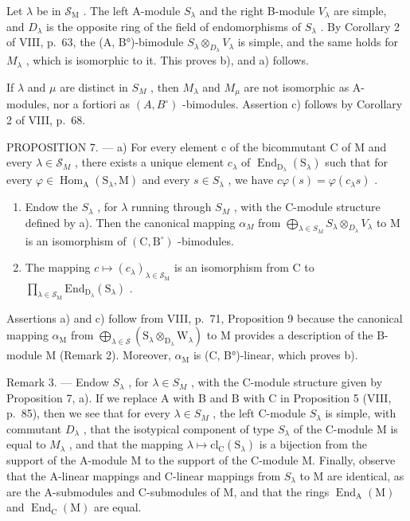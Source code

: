 Let \(\lambda\) be in \(\mathcal{S}_{\mathrm{M}}\) . The left A-module \(S_{\lambda}\) and the right B-module \(V_{\lambda}\) are simple, and \(D_{\lambda}\) is the opposite ring of the field of endomorphisms of \(S_{\lambda}\) . By Corollary 2 of VIII, p.~63, the (A, B°)-bimodule \(S_{\lambda} \otimes_{D_{\lambda}} V_{\lambda}\) is simple, and the same holds for \(M_{\lambda}\) , which is isomorphic to it. This proves b), and a) follows.

If \(\lambda\) and \(\mu\) are distinct in \(S_{M}\) , then \(M_{\lambda}\) and \(M_{\mu}\) are not isomorphic as A-modules, nor a fortiori as \((A,B^{\circ})\) -bimodules. Assertion c) follows by Corollary 2 of VIII, p.~68.

PROPOSITION 7. --- a) For every element c of the bicommutant C of M and every \(\lambda\in\mathcal{S}_{M}\) , there exists a unique element \(c_{\lambda}\) of \(\operatorname{End}_{\mathrm{D}_{\lambda}}(\mathrm{S}_{\lambda})\) such that for every \(\varphi\in\operatorname{Hom}_{\mathrm{A}}(\mathrm{S}_{\lambda},\mathrm{M})\) and every \(s\in S_{\lambda}\) , we have \(c\varphi(s)=\varphi(c_{\lambda}s)\) .

\begin{enumerate}
\def\labelenumi{\alph{enumi})}
\setcounter{enumi}{1}
\item
  Endow the \(S_{\lambda}\) , for \(\lambda\) running through \(S_{M}\) , with the C-module structure defined by a). Then the canonical mapping \(\alpha_{M}\) from \(\bigoplus_{\lambda\in S_{M}}S_{\lambda}\otimes_{D_{\lambda}}V_{\lambda}\) to M is an isomorphism of \((\mathrm{C},\mathrm{B}^{\circ})\) -bimodules.
\item
  The mapping \(c \mapsto (c_{\lambda})_{\lambda \in \mathcal{S}_{\mathrm{M}}}\) is an isomorphism from C to \(\prod_{\lambda \in \mathcal{S}_{\mathrm{M}}}\mathrm{End}_{\mathrm{D}_{\lambda}}(\mathrm{S}_{\lambda})\) .
\end{enumerate}

Assertions a) and c) follow from VIII, p.~71, Proposition 9 because the canonical mapping \(\alpha_{\mathrm{M}}\) from \(\bigoplus_{\lambda \in \mathcal{S}} (\mathrm{S}_{\lambda} \otimes_{\mathrm{D}_{\lambda}} \mathrm{W}_{\lambda})\) to M provides a description of the B-module M (Remark 2). Moreover, \(\alpha_{\mathrm{M}}\) is (C, B°)-linear, which proves b).

Remark 3. --- Endow \(S_{\lambda}\) , for \(\lambda \in S_{M}\) , with the C-module structure given by Proposition 7, a). If we replace A with B and B with C in Proposition 5 (VIII, p.~85), then we see that for every \(\lambda \in S_{M}\) , the left C-module \(S_{\lambda}\) is simple, with commutant \(D_{\lambda}\) , that the isotypical component of type \(S_{\lambda}\) of the C-module M is equal to \(M_{\lambda}\) , and that the mapping \(\lambda \mapsto \mathrm{cl}_{\mathrm{C}}(\mathrm{S}_{\lambda})\) is a bijection from the support of the A-module M to the support of the C-module M. Finally, observe that the A-linear mappings and C-linear mappings from \(S_{\lambda}\) to M are identical, as are the A-submodules and C-submodules of M, and that the rings \(\operatorname{End}_{\mathrm{A}}(\mathrm{M})\) and \(\operatorname{End}_{\mathrm{C}}(\mathrm{M})\) are equal.

